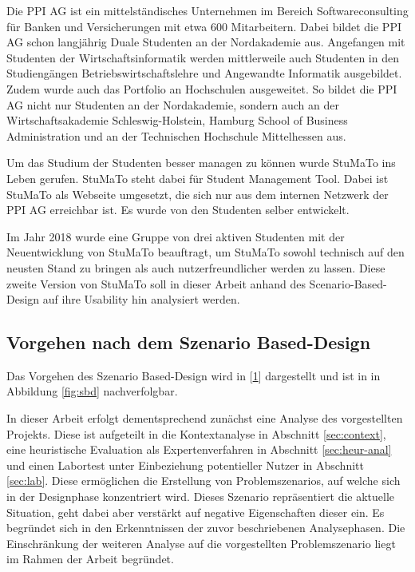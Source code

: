 \documentclass[
  12pt,
  ngerman,
  a4paper,
]{article}
\begin{document}
Die PPI AG ist ein mittelständisches Unternehmen im Bereich
Softwareconsulting für Banken und Versicherungen mit etwa 600
Mitarbeitern. Dabei bildet die PPI AG schon langjährig Duale Studenten
an der Nordakademie aus. Angefangen mit Studenten der
Wirtschaftsinformatik werden mittlerweile auch Studenten in den
Studiengängen Betriebswirtschaftslehre und Angewandte Informatik
ausgebildet. Zudem wurde auch das Portfolio an Hochschulen ausgeweitet.
So bildet die PPI AG nicht nur Studenten an der Nordakademie, sondern
auch an der Wirtschaftsakademie Schleswig-Holstein, Hamburg School of
Business Administration und an der Technischen Hochschule Mittelhessen
aus.

Um das Studium der Studenten besser managen zu können wurde StuMaTo ins
Leben gerufen. StuMaTo steht dabei für Student Management Tool. Dabei
ist StuMaTo als Webseite umgesetzt, die sich nur aus dem internen
Netzwerk der PPI AG erreichbar ist. Es wurde von den Studenten selber
entwickelt.

Im Jahr 2018 wurde eine Gruppe von drei aktiven Studenten mit der
Neuentwicklung von StuMaTo beauftragt, um StuMaTo sowohl technisch auf
den neusten Stand zu bringen als auch nutzerfreundlicher werden zu
lassen. Diese zweite Version von StuMaTo soll in dieser Arbeit anhand
des Scenario-Based-Design auf ihre Usability hin analysiert werden.

\hypertarget{vorgehen-nach-dem-szenario-based-design}{%
\subsection{Vorgehen nach dem Szenario
Based-Design}\label{vorgehen-nach-dem-szenario-based-design}}

Das Vorgehen des Szenario Based-Design wird in
{[}\protect\hyperlink{ref-sbd}{1}{]} dargestellt und ist in in Abbildung
\ref{fig:sbd} nachverfolgbar.

In dieser Arbeit erfolgt dementsprechend zunächst eine Analyse des
vorgestellten Projekts. Diese ist aufgeteilt in die Kontextanalyse in
Abschnitt \ref{sec:context}, eine heuristische Evaluation als
Expertenverfahren in Abschnitt \ref{sec:heur-anal} und einen Labortest
unter Einbeziehung potentieller Nutzer in Abschnitt \ref{sec:lab}. Diese
ermöglichen die Erstellung von Problemszenarios, auf welche sich in der
Designphase konzentriert wird. Dieses Szenario repräsentiert die
aktuelle Situation, geht dabei aber verstärkt auf negative Eigenschaften
dieser ein. Es begründet sich in den Erkenntnissen der zuvor
beschriebenen Analysephasen. Die Einschränkung der weiteren Analyse auf
die vorgestellten Problemszenario liegt im Rahmen der Arbeit begründet.
\end{document}

